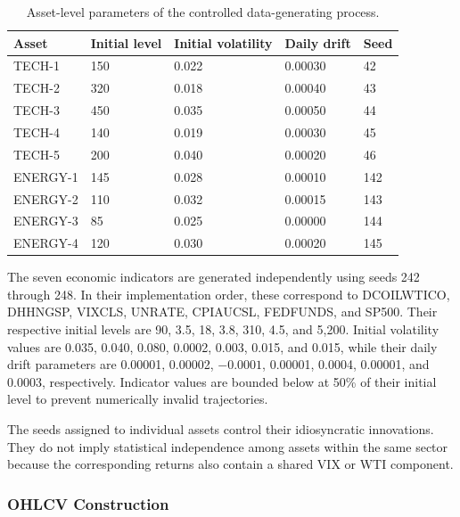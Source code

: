 \documentclass[utf8]{FrontiersinHarvard} %
\begin{document}
\begin{table}[h]
	\caption{Asset-level parameters of the controlled data-generating process.}
	\label{tab:generator_parameters}
	\setlength{\tabcolsep}{3pt}
	\centering
	\begin{tabular}{p{70pt}p{65pt}p{85pt}p{65pt}p{45pt}}
		\hline
		\textbf{Asset} &
		\textbf{Initial level} &
		\textbf{Initial volatility} &
		\textbf{Daily drift} &
		\textbf{Seed} \\
		\hline
		
		TECH-1   & 150 & 0.022 & 0.00030 & 42  \\
		TECH-2   & 320 & 0.018 & 0.00040 & 43  \\
		TECH-3   & 450 & 0.035 & 0.00050 & 44  \\
		TECH-4   & 140 & 0.019 & 0.00030 & 45  \\
		TECH-5   & 200 & 0.040 & 0.00020 & 46  \\
		ENERGY-1 & 145 & 0.028 & 0.00010 & 142 \\
		ENERGY-2 & 110 & 0.032 & 0.00015 & 143 \\
		ENERGY-3 & 85  & 0.025 & 0.00000 & 144 \\
		ENERGY-4 & 120 & 0.030 & 0.00020 & 145 \\
		\hline
		
	\end{tabular}
	\footnotesize
\end{table}

The seven economic indicators are generated independently using seeds 242 through 248. In their implementation order, these correspond to DCOILWTICO, DHHNGSP, VIXCLS, UNRATE, CPIAUCSL, FEDFUNDS, and SP500. Their respective initial levels are 90, 3.5, 18, 3.8, 310, 4.5, and 5,200. Initial volatility values are 0.035, 0.040, 0.080, 0.0002, 0.003, 0.015, and 0.015, while their daily drift parameters are 0.00001, 0.00002, \(-0.0001\), 0.00001, 0.0004, 0.00001, and 0.0003, respectively. Indicator values are bounded below at 50\% of their initial level to prevent numerically invalid trajectories.

The seeds assigned to individual assets control their idiosyncratic innovations. They do not imply statistical independence among assets within the same sector because the corresponding returns also contain a shared VIX or WTI component.

\subsubsection{OHLCV Construction}
\end{document}
